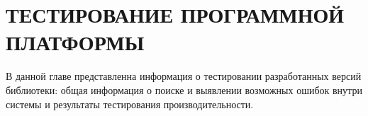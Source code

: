 \chapter{ТЕСТИРОВАНИЕ ПРОГРАММНОЙ ПЛАТФОРМЫ}

В данной главе представленна информация о тестировании разработанных версий 
библиотеки: общая информация о поиске и выявлении возможных ошибок внутри 
системы и результаты тестирования производительности.





